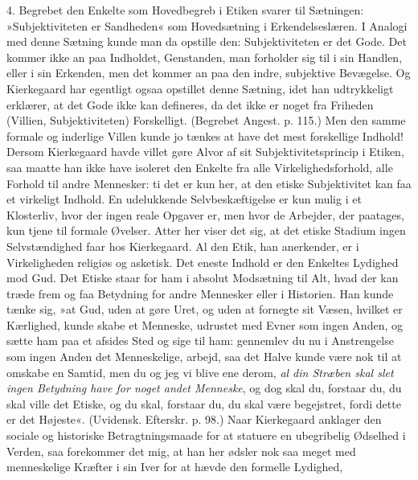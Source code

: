 \documentclass[12pt,a4paper,openany]{book}
\newcommand{\opage}[1]{\marginnote{\footnotesize\textit{[#1]}}}
\begin{document}
4. Begrebet den Enkelte som Hovedbegreb i Etiken
svarer til Sætningen: »Subjektiviteten er Sandheden« som
Hovedsætning i Erkendelseslæren. I Analogi med denne
Sætning kunde man da opstille den: Subjektiviteten er
det Gode. Det kommer ikke an paa Indholdet, Genstanden,
man forholder sig til i sin Handlen, eller i
sin Erkenden, men det kommer an paa den indre, subjektive
Bevægelse. Og Kierkegaard har egentligt ogsaa
opstillet denne Sætning, idet han udtrykkeligt erklærer,
at det Gode ikke kan defineres, da det ikke er noget fra
Friheden (Villien, Subjektiviteten) Forskelligt. (Begrebet
Angest. p. 115.) Men den samme formale og inderlige
Villen kunde jo tænkes at have det mest forskellige Indhold!
Dersom Kierkegaard havde villet gøre Alvor af
sit Subjektivitetsprincip i Etiken, saa maatte han ikke
have isoleret den Enkelte fra alle Virkelighedsforhold,
alle Forhold til andre Mennesker: ti det er kun her, at
den etiske Subjektivitet kan faa et virkeligt Indhold. En
udelukkende Selvbeskæftigelse er kun mulig i et Klosterliv,
hvor der ingen reale Opgaver er, men hvor de Arbejder,
der paatages, kun tjene til formale Øvelser. Atter
\opage{104}her viser det sig, at det etiske Stadium ingen Selvstændighed
faar hos Kierkegaard. Al den Etik, han anerkender,
er i Virkeligheden religiøs og asketisk. Det eneste Indhold
er den Enkeltes Lydighed mod Gud. Det Etiske
staar for ham i absolut Modsætning til Alt, hvad der
kan træde frem og faa Betydning for andre Mennesker
eller i Historien. Han kunde tænke sig, »at Gud, uden
at gøre Uret, og uden at fornegte sit Væsen, hvilket er
Kærlighed, kunde skabe et Menneske, udrustet med Evner
som ingen Anden, og sætte ham paa et afsides Sted og
sige til ham: gennemlev du nu i Anstrengelse som ingen
Anden det Menneskelige, arbejd, saa det Halve kunde
være nok til at omskabe en Samtid, men du og jeg vi
blive ene derom, \textit{al din Stræben skal slet ingen Betydning
have for noget andet Menneske}, og dog skal du, forstaar
du, du skal ville det Etiske, og du skal, forstaar du, du
skal være begejstret, fordi dette er det Højeste«. (Uvidensk.
Efterskr. p. 98.) Naar Kierkegaard anklager den
sociale og historiske Betragtningsmaade for at statuere
en ubegribelig Ødselhed i Verden, saa forekommer det
mig, at han her ødsler nok saa meget med menneskelige
Kræfter i sin Iver for at hævde den formelle Lydighed,
\end{document}
